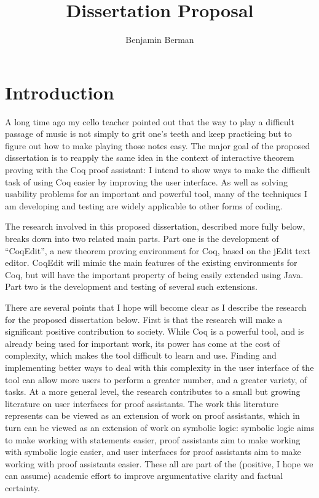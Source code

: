 \documentclass[11pt]{amsart}
\title{Dissertation Proposal}
\author{Benjamin Berman}
\begin{document}
\maketitle
\section{Introduction}

A long time ago my cello teacher pointed out that the way to play a difficult passage of music is not simply to grit one's teeth and keep practicing but to figure out how to make playing those notes easy.  The major goal of the proposed dissertation is to reapply the same idea in the context of interactive theorem proving with the Coq proof assistant:  I intend to show ways to make the difficult task of using Coq easier by improving the user interface.  As well as solving usability problems for an important and powerful tool, many of the techniques I am developing and testing are widely applicable to other forms of coding.

The research involved in this proposed dissertation, described more fully below, breaks down into two related main parts.  Part one is the development of ``CoqEdit'', a new theorem proving environment for Coq, based on the jEdit text editor.  CoqEdit will mimic the main features of the existing environments for Coq, but will have the important property of being easily extended using Java.  Part two is the development and testing of several such extensions.

There are several points that I hope will become clear as I describe the research for the proposed dissertation below.  First is that the research will make a significant positive contribution to society.  While Coq is a powerful tool, and is already being used for important work, its power has come at the cost of complexity, which makes the tool difficult to learn and use.  Finding and implementing better ways to deal with this complexity in the user interface of the tool can allow more users to perform a greater number, and a greater variety, of tasks.  At a more general level, the research contributes to a small but growing literature on user interfaces for proof assistants.  The work this literature represents can be viewed as an extension of work on proof assistants, which in turn can be viewed as an extension of work on symbolic logic:  symbolic logic aims to make working with statements easier, proof assistants aim to make working with symbolic logic easier, and user interfaces for proof assistants aim to make working with proof assistants easier.  These all are part of the (positive, I hope we can assume) academic effort to improve argumentative clarity and factual certainty.  
	
\end{document}
